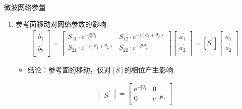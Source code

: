 \begin{frame}{微波网络参量}
    \begin{enumerate}
        \resume
        \item 参考面移动对网络参数的影响
              \begin{align*}
                  \begin{bmatrix*}
                      b_1^{'} \\
                      b_2^{'} \\
                  \end{bmatrix*}
                  =
                  \begin{bmatrix*}
                      S_{11}\cdot\mathrm{e}^{-\mathrm{j}2\theta_1} & S_{12}\cdot\mathrm{e}^{-\mathrm{j}(\theta_1+\theta_2)} \\
                      S_{21}\cdot\mathrm{e}^{-\mathrm{j}(\theta_1+\theta_2)} & S_{22}\cdot \mathrm{e}^{-\mathrm{j}2\theta_2} \\
                  \end{bmatrix*}
                  \begin{bmatrix*}
                      a_1^{'} \\
                      a_2^{'} \\
                  \end{bmatrix*}
                  =[S^{'}]
                  \begin{bmatrix*}
                      a_1^{'} \\
                      a_2^{'} \\
                  \end{bmatrix*}
              \end{align*}
              \begin{itemize}
                  \item 结论：参考面的移动，仅对$[S]$的相位产生影响
              \end{itemize}
              \begin{gather*}
                  \begin{bmatrix*}
                      S^{'}
                  \end{bmatrix*}
                  =
                  \begin{bmatrix*}
                      \mathrm{e}^{-\mathrm{j}\theta_1} & 0 \\
                      0 & \mathrm{e}^{-\mathrm{j}\theta_2} \\
                  \end{bmatrix*}

\end{gather*}
\end{enumerate}
\end{frame}
